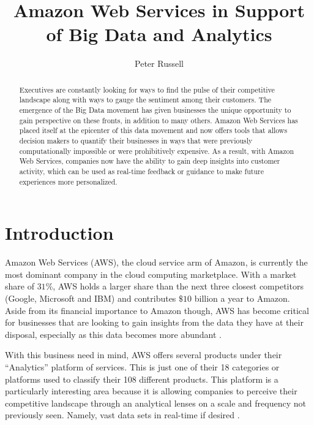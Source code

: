 \documentclass[sigconf]{acmart}
\begin{document}
\title{Amazon Web Services in Support of Big Data and Analytics}


\author{Peter Russell}

\begin{abstract}
Executives are constantly looking for ways to find the pulse of their competitive landscape along with ways to gauge the sentiment among their customers. The emergence of the Big Data movement has given businesses the unique opportunity to gain perspective on these fronts, in addition to many others. Amazon Web Services has placed itself at the epicenter of this data movement and now offers tools that allows decision makers to quantify their businesses in ways that were previously computationally impossible or were  prohibitively expensive. As a result, with Amazon Web Services, companies now have the ability to gain deep insights into customer activity, which can be used as real-time feedback or guidance to make future experiences more personalized.

\end{abstract}


\maketitle

\section{Introduction}

Amazon Web Services (AWS), the cloud service arm of Amazon, is currently the most dominant company in the cloud computing marketplace. With a market share of $31\%$, AWS holds a larger share than the next three closest competitors (Google, Microsoft and IBM) and contributes  $\$10$ billion a year to Amazon\cite{awsmkt}. Aside from its financial importance to Amazon though, AWS has become critical for businesses that are looking to gain insights from the data they have at their disposal, especially as this data becomes more abundant \cite{economist}. 

With this business need in mind, AWS offers several products under their ``Analytics'' platform of services. This is just one of their 18 categories or platforms used to classify their 108 different products. This platform is a particularly interesting area because it is allowing companies to perceive their competitive landscape through an analytical lenses on a scale and frequency not previously seen. Namely, vast data sets in real-time if desired \cite{ge}. 
\end{document}
